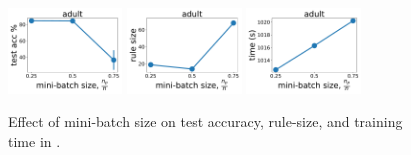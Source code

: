 \begin{figure}[t]
	\subfloat
	{\includegraphics[width=0.27\textwidth]{figures/interpretability/relaxed-cnf/adult_test_accuracy_vary_subsamplesize.pdf}}
	\subfloat
	{\includegraphics[width=0.27\textwidth]{figures/interpretability/relaxed-cnf/adult_rule_size_vary_subsamplesize.pdf}}
	\subfloat
	{\includegraphics[width=0.27\textwidth]{figures/interpretability/relaxed-cnf/adult_time_vary_subsamplesize.pdf}} 
	\\
	
	
	\caption[Effect of mini-batch size in {\crr}]{Effect of mini-batch size on test accuracy, rule-size, and training time in {\crr}. } 
	\label{interpretability_crr_fig:result_minibatch}
\end{figure}




